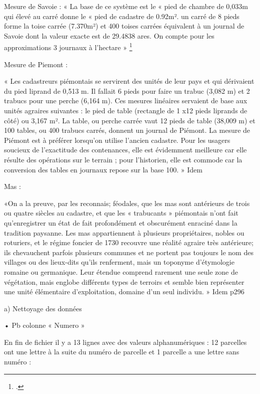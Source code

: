 \documentclass[12pt,a4paper]{report}
\begin{document}
Mesure de Savoie :
« La base de ce système est le « pied de chambre de 0,033m qui élevé au carré donne le « pied de cadastre de 0.92m². un carré de 8 pieds forme la toise carrée (7.370m²) et 400 toises carrées équivalent à un journal de Savoie dont la valeur exacte est de 29.4838 ares. On compte pour les approximations 3 journaux à l’hectare » 	\footcite{GUICHONNET1955}


Mesure de Piemont :

« Les cadastreurs piémontais se servirent des unités de leur pays et qui dérivaient du pied liprand de 0,513 m. Il fallait 6 pieds pour faire un trabuc (3,082 m) et 2 trabucs pour une perche (6,164 m). Ces mesures linéaires servaient de base aux unités agraires suivantes : le pied de table (rectangle de 1 x12 pieds liprands de côté) ou 3,167 m². La table, ou perche carrée vaut 12 pieds de table (38,009 m) et 100 tables, ou 400 trabucs carrés, donnent un journal de Piémont. La mesure de Piémont est à préférer lorsqu’on utilise l’ancien cadastre. Pour les usagers soucieux de l’exactitude des contenances, elle est évidemment meilleure car elle résulte des opérations sur le terrain ; pour l’historien, elle est commode car la conversion des tables en journaux repose sur la base 100. » Idem


Mas :

«On a la preuve, par les reconnais; féodales, que les mas sont antérieurs de trois ou quatre siècles au cadastre, et que les « trabucants » piémontais n’ont fait qu’enregistrer un état de fait profondément et obscurément enraciné dans la tradition paysanne. Les mas appartiennent à plusieurs propriétaires, nobles ou roturiers, et le régime foncier de 1730 recouvre une réalité agraire très antérieure; ils chevauchent parfois plusieurs communes et ne portent pas toujours le nom des villages ou des lieux-dits qu’ils renferment, mais un toponyme d’étymologie romaine ou germanique. Leur étendue comprend rarement une seule zone de végétation, mais englobe différents types de terroirs et semble bien représenter une unité élémentaire d'exploitation, domaine d’un seul individu. » Idem p296

a) Nettoyage des données

•	Pb colonne « Numero »

En fin de fichier il y a 13 lignes avec des valeurs alphanumériques : 12 parcelles ont une lettre à la suite du numéro de parcelle et 1 parcelle a une lettre sans numéro :
\end{document}
